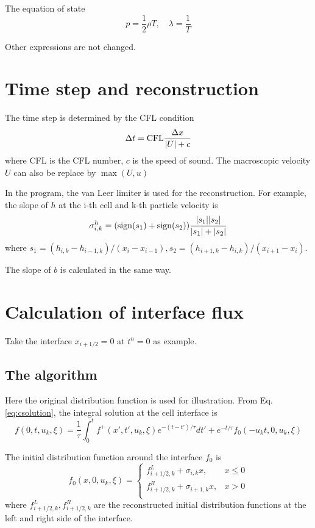 \documentclass[a4paper]{book}
\begin{document}
The equation of state
\begin{equation} 
    \label{eq:eos}
    p=\frac{1}{2}\rho T,\quad \lambda=\frac{1}{T}
\end{equation}

Other expressions are not changed.

\section{Time step and reconstruction}
The time step is determined by the CFL condition
\begin{equation} 
    \Delta t={\rm CFL}\frac{\Delta x}{|U|+c}
\end{equation}
where CFL is the CFL number, $c$ is the speed of sound. The macroscopic velocity $U$ can also be replace by $\max(U,u)$

In the program, the van Leer limiter is used for the reconstruction. For example, the slope of $h$ at the i-th cell and k-th particle velocity is
\begin{equation} 
    \sigma_{i,k}^h = ({\rm sign}(s_1)+{\rm sign}(s_2))\frac{|s_1||s_2|}{|s_1|+|s_2|}
\end{equation}
where $s_1=(h_{i,k}-h_{i-1,k})/(x_i-x_{i-1}), s_2=(h_{i+1,k}-h_{i,k})/(x_{i+1}-x_{i})$.

The slope of $b$ is calculated in the same way.

\section{Calculation of interface flux}
\label{sec:inner_flux}
Take the interface $x_{i+1/2}=0$ at $t^n=0$ as example.

\subsection{The algorithm}
Here the original distribution function is used for illustration. From Eq. \ref{eq:csolution}, the integral solution at the cell interface is
\begin{equation}
    \label{eq:csolution_interface}
    f(0,t,u_k,\xi)=\frac{1}{\tau}\int_{0}^t f^+(x',t',u_k,\xi)e^{-(t-t')/\tau}dt'+e^{-t/\tau}f_0(-u_kt,0,u_k,\xi)
\end{equation}

The initial distribution function around the interface $f_0$ is
\begin{equation}
    \label{eq:f0}
    f_0(x,0,u_k,\xi) = 
    \begin{cases}
        f_{i+1/2,k}^L+\sigma_{i,k}x,& x\leqslant 0\\ 
        f_{i+1/2,k}^R+\sigma_{i+1,k}x,& x> 0\\ 
    \end{cases}
\end{equation}
where $f_{i+1/2,k}^L, f_{i+1/2,k}^R$ are the reconstructed initial distribution functions at the left and right side of the interface.
\end{document}
